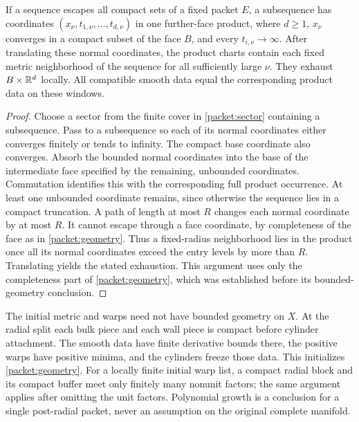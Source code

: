 \begin{lemma}\label{packet:escape}
If a sequence escapes all compact sets of a fixed packet $E$, a
subsequence has coordinates $(x_\nu,t_{1,\nu},\ldots,t_{d,\nu})$
in one further-face product, where $d\ge1$, $x_\nu$ converges in a
compact subset of the face $B$, and every $t_{i,\nu}\to\infty$.
After translating these normal coordinates, the product charts contain
each fixed metric neighborhood of the sequence for all sufficiently
large $\nu$.  They exhaust $B\times\mathbb R^d$ locally.  All compatible
smooth data equal the corresponding product data on these windows.
\end{lemma}

\begin{proof}
Choose a sector from the finite cover in
\cref{packet:sector} containing a subsequence.  Pass to a subsequence
so each of its normal coordinates either converges finitely or tends
to infinity.  The compact base coordinate also converges.  Absorb the
bounded normal coordinates into the base of the intermediate face
specified by the remaining, unbounded coordinates.  Commutation
identifies this with the corresponding full product occurrence.
At least one unbounded coordinate remains, since otherwise the
sequence lies in a compact truncation.  A path of length at most $R$
changes each normal coordinate by at most $R$.  It cannot escape
through a face coordinate, by completeness of the face as in
\cref{packet:geometry}.  Thus a fixed-radius neighborhood lies in the
product once all its normal coordinates exceed the entry levels by
more than $R$.  Translating yields the stated exhaustion.  This
argument uses only the completeness part of \cref{packet:geometry},
which was established before its bounded-geometry conclusion.
\end{proof}

The initial metric and warps need not have bounded geometry on $X$.
At the radial split each bulk piece and each wall piece is compact
before cylinder attachment.  The smooth data have finite derivative
bounds there, the positive warps have positive minima, and the
cylinders freeze those data.  This initializes \cref{packet:geometry}.
For a locally finite initial warp list, a compact radial block and its
compact buffer meet only finitely many nonunit factors; the same
argument applies after omitting the unit factors.  Polynomial growth
is a conclusion for a single post-radial packet, never an assumption
on the original complete manifold.

